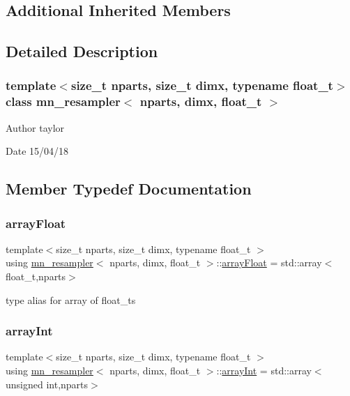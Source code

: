 \subsection*{Additional Inherited Members}


\subsection{Detailed Description}
\subsubsection*{template$<$size\+\_\+t nparts, size\+\_\+t dimx, typename float\+\_\+t$>$\newline
class mn\+\_\+resampler$<$ nparts, dimx, float\+\_\+t $>$}

\begin{DoxyAuthor}{Author}
taylor 
\end{DoxyAuthor}
\begin{DoxyDate}{Date}
15/04/18 
\end{DoxyDate}


\subsection{Member Typedef Documentation}
\mbox{\label{classmn__resampler_ae26be2889cf3cd4ddea66928d879809e}} 
\subsubsection{\texorpdfstring{array\+Float}{arrayFloat}}
{\footnotesize\ttfamily template$<$size\+\_\+t nparts, size\+\_\+t dimx, typename float\+\_\+t $>$ \\
using \hyperlink{classmn__resampler}{mn\+\_\+resampler}$<$ nparts, dimx, float\+\_\+t $>$\+::\hyperlink{classrbase_a6f76bef853e508cb5b6f546d231b06f5}{array\+Float} =  std\+::array$<$float\+\_\+t,nparts$>$}

type alias for array of float\+\_\+ts \mbox{\label{classmn__resampler_afb5d000e2464afef813792c57c42599b}} 
\subsubsection{\texorpdfstring{array\+Int}{arrayInt}}
{\footnotesize\ttfamily template$<$size\+\_\+t nparts, size\+\_\+t dimx, typename float\+\_\+t $>$ \\
using \hyperlink{classmn__resampler}{mn\+\_\+resampler}$<$ nparts, dimx, float\+\_\+t $>$\+::\hyperlink{classmn__resampler_afb5d000e2464afef813792c57c42599b}{array\+Int} =  std\+::array$<$unsigned int,nparts$>$}

